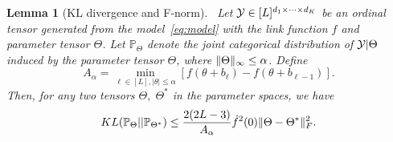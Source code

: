 \documentclass[11pt]{article}
\theoremstyle{plain}
\newtheorem{lem}{Lemma}
\theoremstyle{definition}
\begin{document}
\begin{lem}[KL divergence and F-norm]~\label{lem:KL}
Let $\mathcal{Y}\in[L]^{d_1\times \cdots \times d_K}$ be an ordinal tensor generated from the model~\eqref{eq:model} with the link function $f$ and parameter tensor $\Theta$. Let $\mathbb{P}_{\Theta}$ denote the joint categorical distribution of $\mathcal{Y}|\Theta$ induced by the parameter tensor $\Theta$, where $\lVert\Theta\rVert_\infty\leq \alpha$. Define
\begin{equation}\label{eq:ass}
A_\alpha=\min_{\ell\in[L], |\theta|\leq \alpha}\left[f(\theta+b_\ell)-f(\theta+b_{\ell-1})\right].
\end{equation}
Then, for any two tensors $\Theta,\; \Theta^*$ in the parameter spaces, we have
\[
KL(\mathbb{P}_{\Theta}|| \mathbb{P}_{\Theta^*})\leq {2(2L-3)\over A_\alpha} \dot{f}^2(0)\lVert\Theta-\Theta^*\rVert_F^2.
\]
\end{lem}
\end{document}
